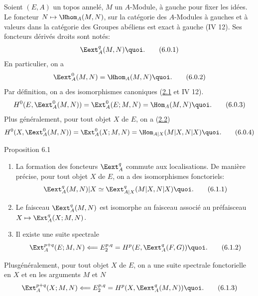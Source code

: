 \setcounter{subsection}{-1}
\subsection{}

Soient $(E, A)$ un topos annelé, $M$ un $A$-Module, à gauche pour
fixer les idées. Le foncteur $N \mapsto \Hhom_A(M, N)$, sur
la catégorie des $A$-Modules à gauches et à valeurs dans la
catégorie des Groupes abéliens est exact à gauche (IV 12). Ses
foncteurs dérivés droits sont notés:
\begin{equation*}
\Eext_A^q(M, N){\quoi}.\tag{6.0.1}
\end{equation*}
En particulier, on a
\begin{equation*}
\Eext_A^{0}(M, N) = \Hhom_A(M, N){\quoi}.\tag{6.0.2}
\end{equation*}
Par définition, on a des isomorphismes canoniques (\hyperref[V.subsec2.1]{2.1} et IV 12).
\begin{equation*}
H^{0} (E, \Eext_A^{0}(M, N)) = \Ext^{0}_A (E;M,
N)=\Hom_A(M, N){\quoi}.\tag{6.0.3}
\end{equation*}
Plus généralement, pour tout objet $X$ de $E$, on a (\hyperref[V.subsec2.2]{2.2})
\begin{equation*}
H^{0} (X, \Eext_A^{0}(M, N)) = \Ext^{0}_A (X;M,
N)=\Hom_{A|X}(M|X, N|X){\quoi}.\tag{6.0.4}
\end{equation*}

\begin{enonce*}{Proposition 6.1}
\begin{enumerate}
\renewcommand{\labelenumi}{\theenumi)}
\item La formation des foncteurs $\Eext^q_A$ commute aux
  localisations. De manière précise, pour tout objet $X$ de $E$,
  on a des isomorphismes fonctoriels:
\begin{equation*}
\Eext^q_A(M, N) | X \simeq \Eext^q_{A|X}(M|X, N|X){\quoi}.\tag{6.1.1}
\end{equation*}

\item Le faisceau $\Eext^q_A(M, N)$ est isomorphe au faisceau associé
  au préfaisceau $X \mapsto \Ext^q_A(X;M, N)$.

\item Il existe une suite spectrale
\begin{equation*}
\Ext^{p+q}_A (E;M, N) \Longleftarrow E^{p, q}_2
 = H^p(E, \Eext^q_A(F, G)){\quoi}.\tag{6.1.2}
\end{equation*}
\end{enumerate}
Plus\pageoriginale généralement, pour tout objet $X$ de $E$, on a
une suite spectrale fonctorielle en $X$ et en les arguments $M$ et $N$
\begin{equation*}
\Ext^{p+q}_A (X;M, N) \Longleftarrow E^{p, q}_2
 = H^p(X, \Eext^q_A(M, N)){\quoi}.\tag{6.1.3}
\end{equation*}
\end{enonce*}

